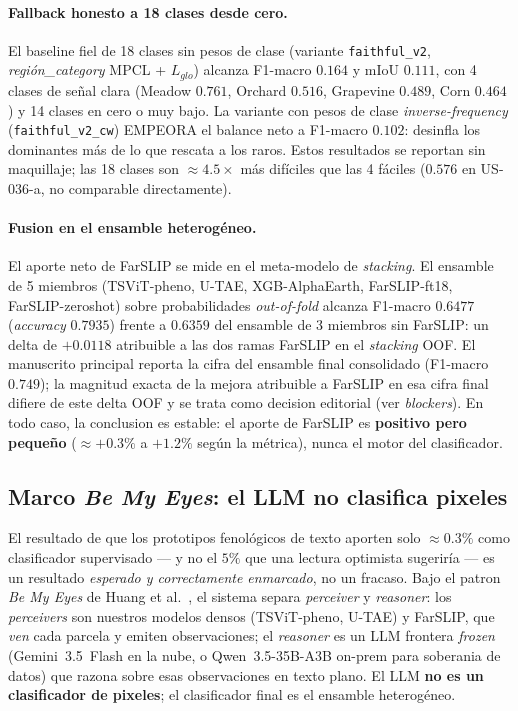 

\paragraph{Fallback honesto a 18 clases desde cero.}
El baseline fiel de 18 clases sin pesos de clase (variante
\texttt{faithful\_v2}, \textit{región\_category} MPCL + $L_{glo}$) alcanza
F1-macro $0.164$ y mIoU $0.111$, con 4 clases de señal clara
(Meadow $0.761$, Orchard $0.516$, Grapevine $0.489$, Corn $0.464$) y 14 clases
en cero o muy bajo. La variante con pesos de clase \textit{inverse-frequency}
(\texttt{faithful\_v2\_cw}) EMPEORA el balance neto a F1-macro $0.102$: desinfla
los dominantes más de lo que rescata a los raros. Estos resultados se reportan
sin maquillaje; las 18 clases son $\approx4.5\times$ más difíciles que las 4
fáciles ($0.576$ en US-036-a, no comparable directamente).

\paragraph{Fusion en el ensamble heterogéneo.}
El aporte neto de FarSLIP se mide en el meta-modelo de \textit{stacking}. El
ensamble de 5 miembros (TSViT-pheno, U-TAE, XGB-AlphaEarth, FarSLIP-ft18,
FarSLIP-zeroshot) sobre probabilidades \textit{out-of-fold} alcanza F1-macro
$0.6477$ (\textit{accuracy} $0.7935$) frente a $0.6359$ del ensamble de 3
miembros sin FarSLIP: un delta de $+0.0118$ atribuible a las dos ramas FarSLIP en
el \textit{stacking} OOF. El manuscrito principal reporta la cifra del ensamble
final consolidado (F1-macro $0.749$); la magnitud exacta de la mejora atribuible
a FarSLIP en esa cifra final difiere de este delta OOF y se trata como decision
editorial (ver \textit{blockers}). En todo caso, la conclusion es estable: el
aporte de FarSLIP es \textbf{positivo pero pequeño} ($\approx+0.3\%$ a $+1.2\%$
según la métrica), nunca el motor del clasificador.

\subsection{Marco \textit{Be My Eyes}: el LLM no clasifica pixeles}
\label{sec:farslip_bemyeyes}

El resultado de que los prototipos fenológicos de texto aporten solo
$\approx0.3\%$ como clasificador supervisado --- y no el $5\%$ que una lectura
optimista sugeriría --- es un resultado \textit{esperado y correctamente
enmarcado}, no un fracaso. Bajo el patron \textit{Be My Eyes} de Huang et
al.~\cite{huang2025bemyeyes}, el sistema separa \textit{perceiver} y
\textit{reasoner}: los \textit{perceivers} son nuestros modelos densos
(TSViT-pheno, U-TAE) y FarSLIP, que \textit{ven} cada parcela y emiten
observaciones; el \textit{reasoner} es un LLM frontera \textit{frozen}
(Gemini~3.5~Flash en la nube, o Qwen~3.5-35B-A3B on-prem para soberania de
datos) que razona sobre esas observaciones en texto plano. El LLM \textbf{no es
un clasificador de pixeles}; el clasificador final es el ensamble heterogéneo.

